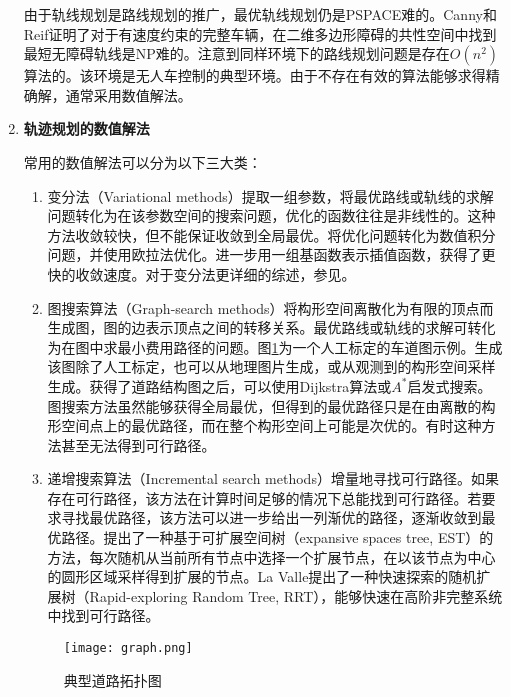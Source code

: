 \begin{enumerate}[wide=\parindent]
由于轨线规划是路线规划的推广，最优轨线规划仍是PSPACE难的。Canny和Reif\cite{Canny1987New}证明了对于有速度约束的完整车辆，在二维多边形障碍的共性空间中找到最短无障碍轨线是NP难的。注意到同样环境下的路线规划问题是存在$O(n^2)$算法的。该环境是无人车控制的典型环境。由于不存在有效的算法能够求得精确解，通常采用数值解法。\\

\item \textbf{轨迹规划的数值解法 }

常用的数值解法可以分为以下三大类：

\begin{enumerate}[label=(\arabic*),wide=\parindent]
\item 变分法（Variational methods）提取一组参数，将最优路线或轨线的求解问题转化为在该参数空间的搜索问题，优化的函数往往是非线性的。这种方法收敛较快，但不能保证收敛到全局最优。将优化问题转化为数值积分问题，并使用欧拉法优化。进一步用一组基函数表示插值函数，获得了更快的收敛速度。对于变分法更详细的综述，参见。

\item 图搜索算法（Graph-search methods）将构形空间离散化为有限的顶点而生成图，图的边表示顶点之间的转移关系。最优路线或轨线的求解可转化为在图中求最小费用路径的问题。图\ref{fig:graph}为一个人工标定的车道图示例。生成该图除了人工标定，也可以从地理图片生成\cite{Backer2007Finding,Wang1996Approximation}，或从观测到的构形空间采样生成\cite{Lavalle1999Rapidly,Glassman2010A}。获得了道路结构图之后，可以使用Dijkstra算法\cite{Dijkstra1959A}或$A^*$启发式搜索\cite{Hart2010A}。图搜索方法虽然能够获得全局最优，但得到的最优路径只是在由离散的构形空间点上的最优路径，而在整个构形空间上可能是次优的。有时这种方法甚至无法得到可行路径。

\item 递增搜索算法（Incremental search methods）增量地寻找可行路径。如果存在可行路径，该方法在计算时间足够的情况下总能找到可行路径。若要求寻找最优路径，该方法可以进一步给出一列渐优的路径，逐渐收敛到最优路径。提出了一种基于可扩展空间树（expansive spaces tree, EST）的方法，每次随机从当前所有节点中选择一个扩展节点，在以该节点为中心的圆形区域采样得到扩展的节点。La Valle\cite{Lavalle1999Rapidly}提出了一种快速探索的随机扩展树（Rapid-exploring Random Tree, RRT），能够快速在高阶非完整系统中找到可行路径。
\end{enumerate}

\begin{figure}[htbp]
\centering
\texttt{[image: graph.png]}
\caption{典型道路拓扑图}
\label{fig:graph}
\end{figure}


\end{enumerate}
